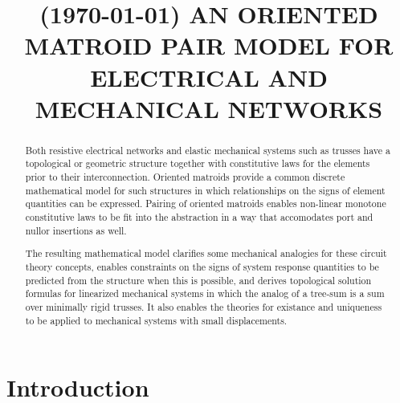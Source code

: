 \documentclass{article}
\title{\extra{REPORT:}
(\today)
AN ORIENTED MATROID PAIR MODEL FOR ELECTRICAL AND MECHANICAL NETWORKS
}
\begin{document}
%
\maketitle
%

\begin{abstract}
Both resistive electrical networks and elastic mechanical systems such
as trusses have a topological or geometric structure together with constitutive
laws for the elements prior to their interconnection.
Oriented matroids provide a common discrete mathematical model 
for such structures in which relationships on the signs of element 
quantities can be expressed.
Pairing of oriented matroids
enables non-linear monotone constitutive laws to be fit
into the abstraction in a way that accomodates port and nullor
insertions as well.

The resulting mathematical model clarifies some mechanical analogies for 
these 
circuit theory concepts, enables constraints on the signs of system response 
quantities to be predicted from the structure when this is possible, 
and derives topological solution formulas for linearized mechanical 
systems in which the analog of a tree-sum is a sum over minimally rigid
trusses.  It also enables the theories for existance and uniqueness to
be applied to mechanical systems with small displacements.
\end{abstract}
%

\section{Introduction}
\label{sec:intro}
\end{document}
